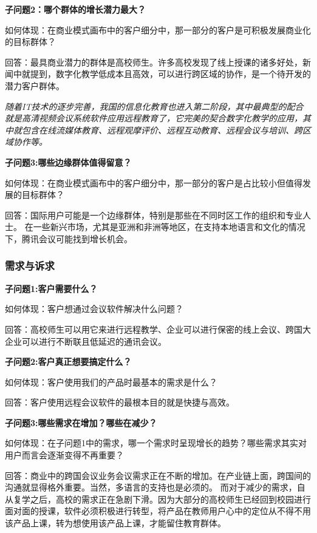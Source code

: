 \documentclass[a4paper,12pt]{article}
\begin{document}
    
    \textbf{子问题2：哪个群体的增长潜力最大？}

    如何体现：在商业模式画布中的客户细分中，那⼀部分的客户是可积极发展商业化的⽬标群体？

    回答：最具商业潜⼒的群体是⾼校师⽣。许多⾼校发现了线上授课的诸多好处，新闻中就提到，数字化教学低成本且⾼效，可以进⾏跨区域的协作，是⼀个待开发的潜⼒客户群体。

    \textit{随着IT技术的逐步完善，我国的信息化教育也进⼊第⼆阶段，其中最典型的配合就是⾼清视频会议系统软件应⽤远程教育了，它完美的契合数字化教学的应⽤，其中就包含在线流媒体教育、远程观摩评价、远程互动教育、远程会议与培训、跨区域协作等。}


    \textbf{子问题3:哪些边缘群体值得留意？}

    如何体现：在商业模式画布中的客户细分中，那⼀部分的客户是占比较小但值得发展的⽬标群体？

    回答：国际用户可能是一个边缘群体，特别是那些在不同时区工作的组织和专业人士。
    在一些新兴市场，尤其是亚洲和非洲等地区，在支持本地语言和文化的情况下，腾讯会议可能找到增长机会。
    \subsubsection{需求与诉求}
    \textbf{子问题1:客户需要什么？}

    如何体现：客户想通过会议软件解决什么问题？

    回答：⾼校师⽣可以⽤它来进⾏远程教学、企业可以进⾏保密的线上会议、跨国⼤企业可以进⾏不断联且低延迟的通讯会议。
    
    \textbf{子问题2:客户真正想要搞定什么？}

    如何体现：客户使⽤我们的产品时最基本的需求是什么？

    回答：客户使⽤远程会议软件的最根本⽬的就是快捷与⾼效。

    \textbf{子问题3:哪些需求在增加？哪些在减少？}

    如何体现：在⼦问题1中的需求，哪⼀个需求时呈现增⻓的趋势？哪些需求其实对⽤户⽽⾔会逐渐变得不再重要？

    回答：商业中的跨国会议业务会议需求正在不断的增加。在产业链上⾯，跨国间的沟通就显得格外重要。当然，多语⾔的⽀持也是必须的。
    而对于减少的需求，⾃从复学之后，⾼校的需求正在急剧下滑。因为⼤部分的⾼校师⽣已经回到校园进⾏⾯对⾯的授课，软件必须积极进⾏转型，将产品在教师⽤户⼼中的定位从不得不⽤该产品上课，转为想使⽤该产品上课，才能留住教育群体。
    
\end{document}
